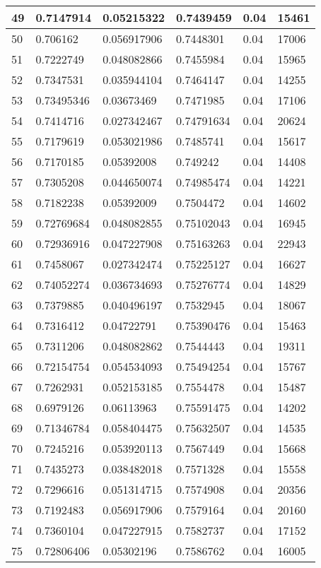 \begin{longtable}{|l|l|l|l|l|l|}
49 & 0.7147914 & 0.05215322 & 0.7439459 & 0.04 & 15461 \\ \hline 
50 & 0.706162 & 0.056917906 & 0.7448301 & 0.04 & 17006 \\ \hline 
51 & 0.7222749 & 0.048082866 & 0.7455984 & 0.04 & 15965 \\ \hline 
52 & 0.7347531 & 0.035944104 & 0.7464147 & 0.04 & 14255 \\ \hline 
53 & 0.73495346 & 0.03673469 & 0.7471985 & 0.04 & 17106 \\ \hline 
54 & 0.7414716 & 0.027342467 & 0.74791634 & 0.04 & 20624 \\ \hline 
55 & 0.7179619 & 0.053021986 & 0.7485741 & 0.04 & 15617 \\ \hline 
56 & 0.7170185 & 0.05392008 & 0.749242 & 0.04 & 14408 \\ \hline 
57 & 0.7305208 & 0.044650074 & 0.74985474 & 0.04 & 14221 \\ \hline 
58 & 0.7182238 & 0.05392009 & 0.7504472 & 0.04 & 14602 \\ \hline 
59 & 0.72769684 & 0.048082855 & 0.75102043 & 0.04 & 16945 \\ \hline 
60 & 0.72936916 & 0.047227908 & 0.75163263 & 0.04 & 22943 \\ \hline 
61 & 0.7458067 & 0.027342474 & 0.75225127 & 0.04 & 16627 \\ \hline 
62 & 0.74052274 & 0.036734693 & 0.75276774 & 0.04 & 14829 \\ \hline 
63 & 0.7379885 & 0.040496197 & 0.7532945 & 0.04 & 18067 \\ \hline 
64 & 0.7316412 & 0.04722791 & 0.75390476 & 0.04 & 15463 \\ \hline 
65 & 0.7311206 & 0.048082862 & 0.7544443 & 0.04 & 19311 \\ \hline 
66 & 0.72154754 & 0.054534093 & 0.75494254 & 0.04 & 15767 \\ \hline 
67 & 0.7262931 & 0.052153185 & 0.7554478 & 0.04 & 15487 \\ \hline 
68 & 0.6979126 & 0.06113963 & 0.75591475 & 0.04 & 14202 \\ \hline 
69 & 0.71346784 & 0.058404475 & 0.75632507 & 0.04 & 14535 \\ \hline 
70 & 0.7245216 & 0.053920113 & 0.7567449 & 0.04 & 15668 \\ \hline 
71 & 0.7435273 & 0.038482018 & 0.7571328 & 0.04 & 15558 \\ \hline 
72 & 0.7296616 & 0.051314715 & 0.7574908 & 0.04 & 20356 \\ \hline 
73 & 0.7192483 & 0.056917906 & 0.7579164 & 0.04 & 20160 \\ \hline 
74 & 0.7360104 & 0.047227915 & 0.7582737 & 0.04 & 17152 \\ \hline 
75 & 0.72806406 & 0.05302196 & 0.7586762 & 0.04 & 16005 \\ \hline 
\end{longtable}